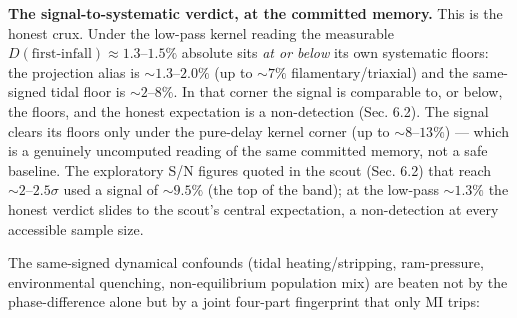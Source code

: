 \documentclass[
]{article}
\begin{document}
\textbf{The signal-to-systematic verdict, at the committed memory.} This
is the honest crux. Under the low-pass kernel reading the measurable
\(D(\text{first-infall})\approx1.3\)--\(1.5\%\) absolute sits \emph{at
or below} its own systematic floors: the projection alias is
\(\sim1.3\)--\(2.0\%\) (up to \(\sim7\%\) filamentary/triaxial) and the
same-signed tidal floor is \(\sim2\)--\(8\%\). In that corner the signal
is comparable to, or below, the floors, and the honest expectation is a
non-detection (Sec. 6.2). The signal clears its floors only under the
pure-delay kernel corner (up to \(\sim8\)--\(13\%\)) --- which is a
genuinely uncomputed reading of the same committed memory, not a safe
baseline. The exploratory S/N figures quoted in the scout (Sec. 6.2)
that reach \(\sim2\)--\(2.5\sigma\) used a signal of \(\sim9.5\%\) (the
top of the band); at the low-pass \(\sim1.3\%\) the honest verdict
slides to the scout's central expectation, a non-detection at every
accessible sample size.

The same-signed dynamical confounds (tidal heating/stripping,
ram-pressure, environmental quenching, non-equilibrium population mix)
are beaten not by the phase-difference alone but by a joint four-part
fingerprint that only MI trips:
\end{document}
